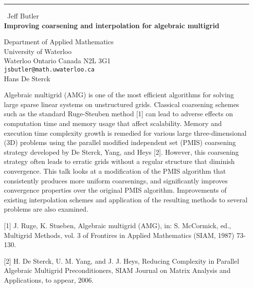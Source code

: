 \documentclass{report}
\begin{document}
\begin{center}
\rule{6in}{1pt} \
{\large Jeff Butler \\
{\bf Improving coarsening and interpolation for algebraic multigrid}}

Department of Applied Mathematics \\ University of Waterloo \\ Waterloo Ontario Canada N2L 3G1
\\
{\tt jsbutler@math.uwaterloo.ca}\\
Hans De Sterck\end{center}

Algebraic multigrid (AMG) is one of the most efficient algorithms for
solving large sparse linear systems on unstructured grids. Classical
coarsening schemes such as the standard Ruge-Steuben method [1] can lead
to adverse effects on computation time and memory usage that affect
scalability. Memory and execution time complexity growth is remedied for
various large three-dimensional (3D) problems using the parallel modified
independent set (PMIS) coarsening strategy
developed by De Sterck, Yang, and Heys [2]. However, this
coarsening strategy often leads to erratic grids without a regular
structure that diminish convergence. This talk looks at a modification of
the PMIS algorithm that consistently produces more uniform coarsenings,
and significantly improves convergence properties over the original PMIS
algorithm. Improvements of existing interpolation schemes and application
of the resulting methods to several problems are also examined.


[1] J. Ruge, K. Stueben, Algebraic multigrid (AMG), in: S. McCormick,
ed., Multigrid Methods, vol. 3 of Frontires in Applied Mathematics (SIAM,
1987) 73-130.

[2] H. De Sterck, U. M. Yang, and J. J. Heys, Reducing Complexity in
Parallel Algebraic Multigrid Preconditioners, SIAM Journal on Matrix
Analysis and Applications, to appear, 2006.
\end{document}
